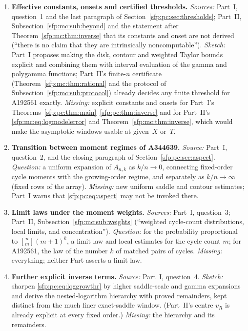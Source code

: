 \documentclass[11pt,letterpaper]{article}
\numberwithin{equation}{section}
\theoremstyle{definition}\newtheorem{definition}[theorem]{Definition}
\theoremstyle{remark}\newtheorem{remark}[theorem]{Remark}
\newcommand{\sone}[2]{\genfrac{[}{]}{0pt}{}{#1}{#2}}
\begin{document}
\begin{enumerate}
\item\label{sfp:q:effective} \textbf{Effective constants, onsets and certified thresholds.} \emph{Sources:} Part~I, question~1 and the last paragraph of Section~\ref{sfp:pc:sec:thresholds}; Part~II, Subsection~\ref{sfp:mc:sub:beyond} and the statement after Theorem~\ref{sfp:mc:thm:inverse} that its constants and onset are not derived (``there is no claim that they are intrinsically noncomputable''). \emph{Sketch:} Part~I proposes making the disk, contour and weighted Taylor bounds explicit and combining them with interval evaluation of the gamma and polygamma functions; Part~II's finite-$n$ certificate (Theorem~\ref{sfp:mc:thm:rational} and the protocol of Subsection~\ref{sfp:mc:sub:protocol}) already decides any finite threshold for A192561 exactly. \emph{Missing:} explicit constants and onsets for Part~I's Theorems~\ref{sfp:pc:thm:main}--\ref{sfp:pc:thm:inverse} and for Part~II's \eqref{sfp:mc:eq:logmodelerror} and Theorem~\ref{sfp:mc:thm:inverse}, which would make the asymptotic windows usable at given~$X$ or~$T$.
\item\label{sfp:q:transition} \textbf{Transition between moment regimes of A344639.} \emph{Source:} Part~I, question~2, and the closing paragraph of Section~\ref{sfp:pc:sec:aspect}. \emph{Question:} a uniform expansion of $A_{n,k}$ as $k/n\to0$, connecting fixed-order cycle moments with the growing-order regime, and separately as $k/n\to\infty$ (fixed rows of the array). \emph{Missing:} new uniform saddle and contour estimates; Part~I warns that \eqref{sfp:pc:eq:aspect} may not be invoked there.
\item\label{sfp:q:laws} \textbf{Limit laws under the moment weights.} \emph{Sources:} Part~I, question~3; Part~II, Subsection~\ref{sfp:mc:sub:weights} (``weighted cycle-count distributions, local limits, and concentration''). \emph{Question:} for the probability proportional to $\sone nm(m+1)^k$, a limit law and local estimates for the cycle count $m$; for A192561, the law of the number $k$ of matched pairs of cycles. \emph{Missing:} everything; neither Part asserts a limit law.
\item\label{sfp:q:nested} \textbf{Further explicit inverse terms.} \emph{Source:} Part~I, question~4. \emph{Sketch:} sharpen \eqref{sfp:pc:eq:loggrowthr} by higher saddle-scale and gamma expansions and derive the nested-logarithm hierarchy with proved remainders, kept distinct from the much finer exact-saddle window. (Part~II's centre $v_R$ is already explicit at every fixed order.) \emph{Missing:} the hierarchy and its remainders.

\end{enumerate}
\end{document}
